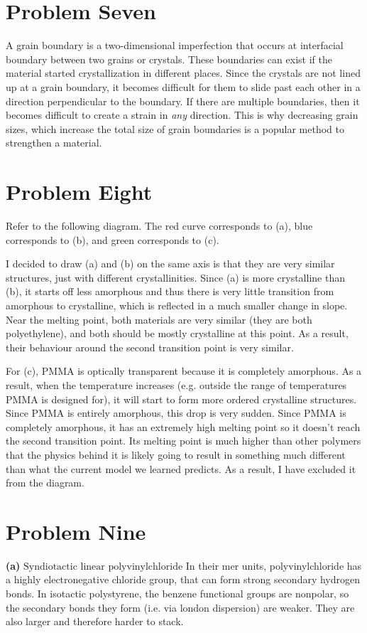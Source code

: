 \documentclass{article}
\begin{document}
    \section*{Problem Seven}
    A grain boundary is a two-dimensional imperfection that occurs at interfacial boundary between two grains or crystals. These boundaries can exist if the material started crystallization in different places. Since the crystals are not lined up at a grain boundary, it becomes difficult for them to slide past each other in a direction perpendicular to the boundary. If there are multiple boundaries, then it becomes difficult to create a strain in \textit{any} direction. This is why decreasing grain sizes, which increase the total size of grain boundaries is a popular method to strengthen a material.
    \section*{Problem Eight}
    Refer to the following diagram. The red curve corresponds to (a), blue corresponds to (b), and green corresponds to (c).
    \begin{center}
    \end{center}
    I decided to draw (a) and (b) on the same axis is that they are very similar structures, just with different crystallinities. Since (a) is more crystalline than (b), it starts off less amorphous and thus there is very little transition from amorphous to crystalline, which is reflected in a much smaller change in slope. Near the melting point, both materials are very similar (they are both polyethylene), and both should be mostly crystalline at this point. As a result, their behaviour around the second transition point is very similar.
    
    For (c), PMMA is optically transparent because it is completely amorphous. As a result, when the temperature increases (e.g. outside the range of temperatures PMMA is designed for), it will start to form more ordered crystalline structures. Since PMMA is entirely amorphous, this drop is very sudden. Since PMMA is completely amorphous, it has an extremely high melting point so it doesn't reach the second transition point. Its melting point is much higher than other polymers that the physics behind it is likely going to result in something much different than what the current model we learned predicts. As a result, I have excluded it from the diagram.
    \section*{Problem Nine}
    \textbf{(a)} $\boxed{\text{Syndiotactic linear polyvinylchloride}}$ In their mer units, polyvinylchloride has a highly electronegative chloride group, that can form strong secondary hydrogen bonds. In isotactic polystyrene, the benzene functional groups are nonpolar, so the secondary bonds they form (i.e. via london dispersion) are weaker. They are also larger and therefore harder to stack.
\end{document}
